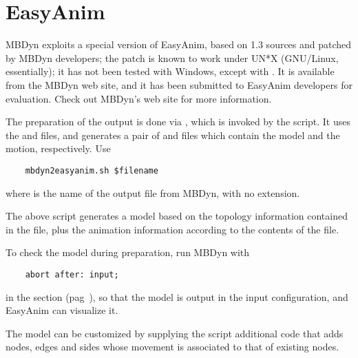 \section{EasyAnim}
\label{sec:APP:OUTPUTRESULTS:EASYANIM}
MBDyn exploits a special version of EasyAnim, based on 1.3 sources
and patched by MBDyn developers; the patch is known to work under UN*X
(GNU/Linux, essentially); it has not been tested with Windows, except with
.
It is available from the MBDyn web site, and it has been submitted
to EasyAnim developers for evaluation.
Check out MBDyn's web site for more information.

The preparation of the output is done via , which is invoked
by the  script.
It uses the  and  files, and generates a pair of
 and  files which contain the model and the motion,
respectively.
Use
\begin{verbatim}
    mbdyn2easyanim.sh $filename
\end{verbatim}
where  is the name of the output file from MBDyn,
with no extension.

The above script generates a model based on the topology information
contained in the  file, plus the animation information
according to the contents of the  file.

To check the model during preparation, run MBDyn with
\begin{verbatim}
    abort after: input;
\end{verbatim}
in the  section (pag~\pageref{sec:IVP:abort after}),
so that the model is output in the input configuration,
and EasyAnim can visualize it.

The model can be customized by supplying the 
script additional  code that adds nodes, edges and sides 
whose movement is associated to that of existing nodes.

